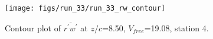 \begin{figure}[H]
\centering
\texttt{[image: figs/run\_33/run\_33\_rw\_contour]}
\caption{Contour plot of $\overline{r^\prime w^\prime}$ at $z/c$=8.50, $V_{free}$=19.08, station 4.}
\label{fig:run_33_rw_contour}
\end{figure}


